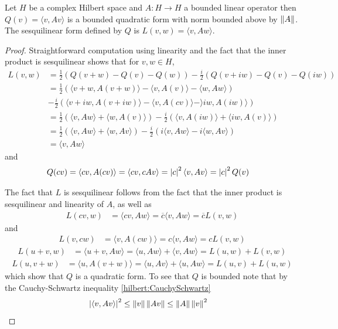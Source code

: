 \begin{prop}\label{hilbert:QuadraticFormFromOperator}Let $H$ be a complex Hilbert space and $A : H \to H$ a bounded linear operator then $Q(v) = \langle v, A v \rangle$ is a bounded quadratic form with norm bounded above by $\left \lVert A \right \rVert$.  The sesquilinear form defined by $Q$ is $L(v,w) = \langle v, Aw \rangle$.
\end{prop}
\begin{proof}
Straightforward computation using linearity and the fact that the inner product is sesquilinear shows that for $v,w \in H$,
\begin{align*}
L(v, w) &= \frac{1}{2} \left ( Q(v+w) - Q(v) - Q(w) \right) - \frac{i}{2} \left (Q(v+iw) - Q(v) - Q(iw) \right) \\
&= \frac{1}{2} \left ( \langle v+w, A(v+w) \rangle - \langle v, A(v) \rangle - \langle w, Aw \rangle \right) \\
&- \frac{i}{2} \left ( \langle v+iw, A(v + iw) \rangle - \langle v, A(cv) \rangle - \rangle iw, A(iw) \rangle \right) \\
&= \frac{1}{2} \left ( \langle v, Aw \rangle + \langle w, A(v) \rangle \right) - \frac{i}{2} \left ( \langle v, A(iw) \rangle + \langle iw, A(v) \rangle \right) \\
&= \frac{1}{2} \left ( \langle v, Aw \rangle +  \langle w, Av \rangle \right) - \frac{i}{2} \left ( i \langle v, Aw \rangle - i\langle w, Av \rangle \right) \\
&= \langle v, Aw \rangle 
\end{align*}
and
\begin{align*}
Q(cv) &= \langle cv, A (cv) \rangle = \langle cv, c A v \rangle = \left \vert c \right \vert^2 \langle v, A v \rangle = \left \vert c \right \vert^2Q(v)
\end{align*}

The fact that $L$ is sesquilinear follows from the fact that the inner product is sesquilinear and linearity of $A$,
as well as 
\begin{align*}
L(cv, w) &= \langle cv, Aw \rangle = \overline{c} \langle v, Aw \rangle = \overline{c} L(v,w)
\end{align*}
and
\begin{align*}
L(v, cw) &= \langle v, A(cw) \rangle = c \langle v, Aw \rangle = c L(v,w)
\end{align*}
\begin{align*}
L(u+v, w) &=\langle u+v, Aw \rangle = \langle u, Aw \rangle + \langle v, Aw \rangle = L(u,w) + L(v,w)
\end{align*}
\begin{align*}
L(u, v+w) &= \langle u, A(v+w) \rangle = \langle u, Av \rangle + \langle u, Aw \rangle = L(u,v) + L(u,w)
\end{align*}
which show that $Q$ is a quadratic form.  To see that $Q$ is bounded note that by the Cauchy-Schwartz inequality \ref{hilbert:CauchySchwartz}
\begin{align*}
\left \vert \langle v, Av \rangle \right \vert^2 &\leq \left \lVert v \right \rVert \left \lVert Av \right \rVert \leq \left \lVert A \right \rVert \left \lVert v \right \rVert^2
\end{align*}
\end{proof}


